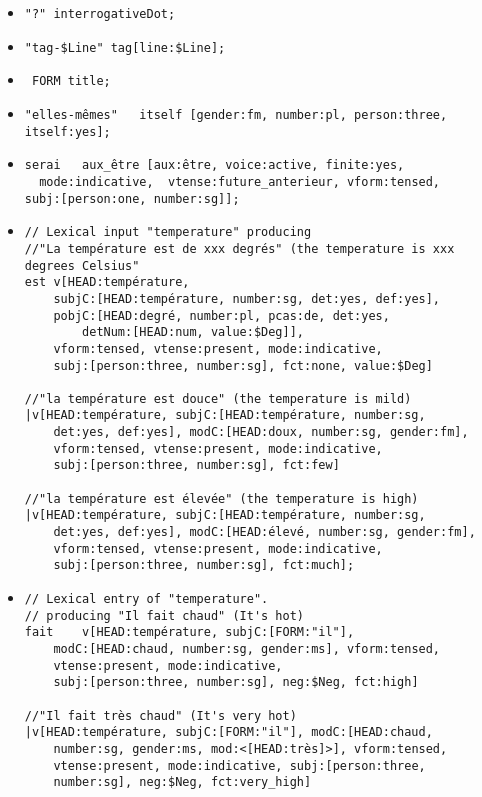 \documentclass[11pt]{article}
\begin{document}
\begin{itemize}
\item \verb#"?" interrogativeDot;#

\bigskip
\item \verb#"tag-$Line" tag[line:$Line]; #

\bigskip
\item \verb# FORM title; #

\bigskip
\item \verb#"elles-mêmes"	itself [gender:fm, number:pl, person:three, itself:yes]; #

\bigskip
\item \begin{verbatim}
serai	aux_être [aux:être, voice:active, finite:yes,
  mode:indicative,  vtense:future_anterieur, vform:tensed, 
subj:[person:one, number:sg]]; 
\end{verbatim}

\bigskip
\item \begin{verbatim}
// Lexical input "temperature" producing 
//"La température est de xxx degrés" (the temperature is xxx degrees Celsius"
est v[HEAD:température, 
	subjC:[HEAD:température, number:sg, det:yes, def:yes], 
	pobjC:[HEAD:degré, number:pl, pcas:de, det:yes,
		detNum:[HEAD:num, value:$Deg]], 
	vform:tensed, vtense:present, mode:indicative, 
	subj:[person:three, number:sg], fct:none, value:$Deg]

//"la température est douce" (the temperature is mild)
|v[HEAD:température, subjC:[HEAD:température, number:sg, 
	det:yes, def:yes], modC:[HEAD:doux, number:sg, gender:fm],
	vform:tensed, vtense:present, mode:indicative, 
	subj:[person:three, number:sg], fct:few]

//"la température est élevée" (the temperature is high)
|v[HEAD:température, subjC:[HEAD:température, number:sg, 
	det:yes, def:yes], modC:[HEAD:élevé, number:sg, gender:fm],
	vform:tensed, vtense:present, mode:indicative, 
	subj:[person:three, number:sg], fct:much];
\end{verbatim}

\bigskip
\item \begin{verbatim}
// Lexical entry of "temperature".
// producing "Il fait chaud" (It's hot)
fait	v[HEAD:température, subjC:[FORM:"il"], 
	modC:[HEAD:chaud, number:sg, gender:ms], vform:tensed,
	vtense:present, mode:indicative, 
	subj:[person:three, number:sg], neg:$Neg, fct:high]

//"Il fait très chaud" (It's very hot)
|v[HEAD:température, subjC:[FORM:"il"], modC:[HEAD:chaud, 
	number:sg, gender:ms, mod:<[HEAD:très]>], vform:tensed, 
	vtense:present, mode:indicative, subj:[person:three, 
	number:sg], neg:$Neg, fct:very_high]


\end{verbatim}
\end{itemize}
\end{document}
